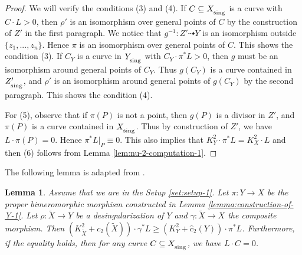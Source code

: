 \documentclass[12pt]{amsart}
\newcommand{\<}{\leq}
\newtheorem{lemma}[theorem]{Lemma}
\theoremstyle{remark}
\theoremstyle{definition}
\theoremstyle{definition}
\numberwithin{equation}{section}
\theoremstyle{definition}
\theoremstyle{definition}
\def\sing{\operatorname{\textsubscript{\rm sing}}}
\begin{document}
\begin{proof}
We will  verify the conditions  (3) and (4). 
If $C\subseteq X_{\sing}$ is a curve with $C\cdot L >0$, then $\rho'$ is an isomorphism over general points of $C$ by the construction of $Z'$ in the first paragraph. 
We notice that $g^{-1}\colon Z' \dashrightarrow Y$ is an isomorphism outside $\{z_1,...,z_n\}$. 
Hence $\pi$ is an isomorphism over general points of $C$. This shows the condition (3). 
If $C_Y$ is a curve in  $Y_{\sing}$ with $C_Y \cdot \pi^*L >0$, then  $g$ must be an isomorphism around general points of $C_Y$. 
Thus $g(C_Y)$ is a curve contained in $Z'_{\sing}$, 
and $\rho'$ is an isomorphism around general points of $g(C_Y)$ by the second paragraph.  
This shows the condition (4). 

For (5), observe that if $\pi(P)$ is not a point, then $g(P)$ is  a divisor in $Z'$, and $\pi(P)$  is a curve   contained in $X_{\sing}$. Thus by construction of $Z'$,  we have $L\cdot \pi(P) =0$. 
Hence $\pi^*L|_P \equiv 0$. This also implies that $K_Y^2 \cdot \pi^*L = K_X^2 \cdot L$ and then (6) follows from Lemma \ref{lem:nu-2-computation-1}.
\end{proof}

The following lemma is adapted from \cite[Lemma 14.3.1]{Kol92}.

\begin{lemma}
\label{lemma:comparison-c2-1}
Assume that we are in the Setup \ref{set:setup-1}. Let $\pi:Y\to X$ be the proper bimeromorphic morphism constructed in Lemma \ref{lemma:construction-of-Y-1}. Let $\rho\colon \widetilde{X} \to Y$ be a desingularization of $Y$ and $\gamma\colon \widetilde{X} \to X$ the composite morphism. 
Then $(K_{\widetilde{X}}^2+c_2(\widetilde{X})) \cdot \gamma^*L  \geq (K_{Y}^2+\hat{c}_2(Y)) \cdot \pi^*L$. 
Furthermore,  if the equality holds, then for any curve $C \subseteq X_{\sing}$, we have $L\cdot C = 0$.
\end{lemma}
\end{document}
